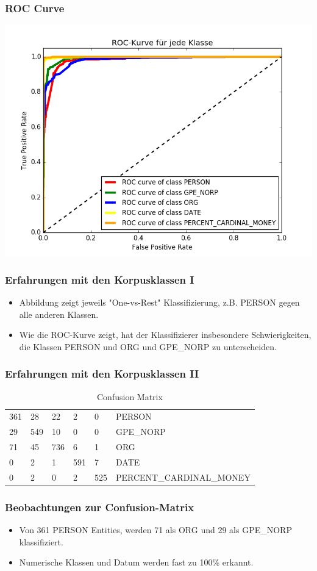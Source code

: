 \documentclass{beamer}
\begin{document}
	\begin{frame}
		\frametitle{ROC Curve}
		\includegraphics[scale=0.54]{roc_curve.png}
	\end{frame}
		\begin{frame}
			\frametitle{Erfahrungen mit den Korpusklassen I}
			\begin{itemize}
				\item Abbildung zeigt jeweils "One-vs-Rest" Klassifizierung, z.B. PERSON gegen alle anderen Klassen.
				
				\item Wie die ROC-Kurve zeigt, hat der Klassifizierer insbesondere Schwierigkeiten, die Klassen PERSON und ORG und GPE\_NORP zu unterscheiden.
			\end{itemize}
			
		\end{frame}
		\begin{frame}
			\frametitle{Erfahrungen mit den Korpusklassen II}
			\begin{table}
				\caption{Confusion Matrix}
				\begin{tabularx}{\textwidth}{llllll}
					\toprule
					361 & 28 & 22 & 2 & 0 & PERSON\\
					29 & 549 & 10 & 0 & 0 & GPE\_NORP\\
					71 & 45 & 736 & 6 & 1 & ORG\\
					0 & 2 & 1 & 591 & 7 & DATE\\
					0 & 2 & 0 & 2 & 525 & PERCENT\_CARDINAL\_MONEY\\
					\bottomrule
				\end{tabularx}
				\label{tab:allf2}
			\end{table}			
		\end{frame}
	\begin{frame}
		\frametitle{Beobachtungen zur Confusion-Matrix}
		\begin{itemize}
			\item Von 361 PERSON Entities, werden 71 als ORG und 29 als GPE\_NORP klassifiziert.

			\item Numerische Klassen und Datum werden fast zu 100\% erkannt.
		\end{itemize}
	\end{frame}	
\end{document}
